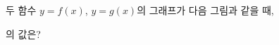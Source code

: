 두 함수 $y=f(x)$, $y=g(x)$의 그래프가 다음 그림과 같을 때,\par\smallskip{}\par\smallskip\noindent 의 값은?
\par\smallskip\begin{center}\resizebox{\ifdim\width>\linewidth\linewidth\else\width\fi}{!}{}\end{center}
